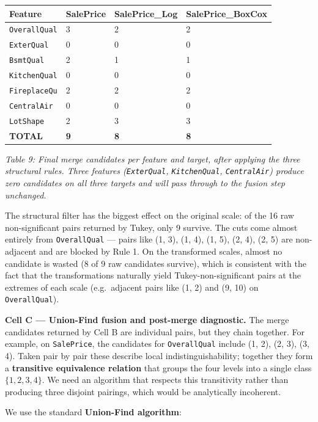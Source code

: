 \begin{longtable}[]{@{}llll@{}}
\toprule\noalign{}
Feature & SalePrice & SalePrice\_Log & SalePrice\_BoxCox \\
\midrule\noalign{}
\endhead
\bottomrule\noalign{}
\endlastfoot
\texttt{OverallQual} & 3 & 2 & 2 \\
\texttt{ExterQual} & 0 & 0 & 0 \\
\texttt{BsmtQual} & 2 & 1 & 1 \\
\texttt{KitchenQual} & 0 & 0 & 0 \\
\texttt{FireplaceQu} & 2 & 2 & 2 \\
\texttt{CentralAir} & 0 & 0 & 0 \\
\texttt{LotShape} & 2 & 3 & 3 \\
\textbf{TOTAL} & \textbf{9} & \textbf{8} & \textbf{8} \\
\end{longtable}

\emph{Table 9: Final merge candidates per feature and target, after
applying the three structural rules. Three features (\texttt{ExterQual},
\texttt{KitchenQual}, \texttt{CentralAir}) produce zero candidates on
all three targets and will pass through to the fusion step unchanged.}

The structural filter has the biggest effect on the original scale: of
the 16 raw non-significant pairs returned by Tukey, only 9 survive. The
cuts come almost entirely from \texttt{OverallQual} --- pairs like (1,
3), (1, 4), (1, 5), (2, 4), (2, 5) are non-adjacent and are blocked by
Rule 1. On the transformed scales, almost no candidate is wasted (8 of 9
raw candidates survive), which is consistent with the fact that the
transformations naturally yield Tukey-non-significant pairs at the
extremes of each scale (e.g.~adjacent pairs like (1, 2) and (9, 10) on
\texttt{OverallQual}).

\textbf{Cell C --- Union-Find fusion and post-merge diagnostic.} The
merge candidates returned by Cell B are individual pairs, but they chain
together. For example, on \texttt{SalePrice}, the candidates for
\texttt{OverallQual} include (1, 2), (2, 3), (3, 4). Taken pair by pair
these describe local indistinguishability; together they form a
\textbf{transitive equivalence relation} that groups the four levels
into a single class \(\{1, 2, 3, 4\}\). We need an algorithm that
respects this transitivity rather than producing three disjoint
pairings, which would be analytically incoherent.

We use the standard \textbf{Union-Find algorithm}:

